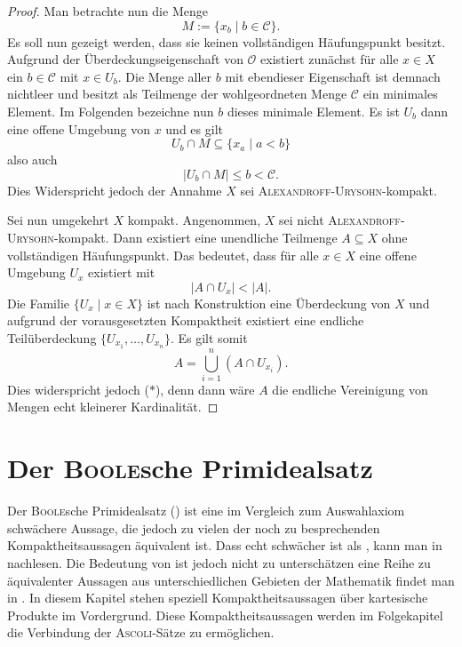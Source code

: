 \begin{proof}
  Man betrachte nun die Menge
  \begin{displaymath}
    M := \{ x_b \mid b \in \mathcal{C} \}.
  \end{displaymath}
  Es soll nun gezeigt werden, dass sie keinen vollständigen Häufungspunkt besitzt. 
  Aufgrund der Überdeckungseigenschaft von $\mathcal{O}$ existiert zunächst für alle $x \in X$ ein $b \in \mathcal{C}$ mit $x \in U_b$.
  Die Menge aller $b$ mit ebendieser Eigenschaft ist demnach nichtleer und besitzt als Teilmenge der wohlgeordneten Menge $\mathcal{C}$ ein minimales Element.
  Im Folgenden bezeichne nun $b$ dieses minimale Element.
  Es ist $U_b$ dann eine offene Umgebung von $x$ und es gilt 
  \begin{displaymath}
    U_b \cap M \subseteq \{x_a \mid a < b\}
  \end{displaymath}
  also auch
  \begin{displaymath}
    |U_b \cap M| \leq b < \mathcal{C}.
  \end{displaymath}
  Dies Widerspricht jedoch der Annahme $X$ sei \textsc{Alexandroff}-\textsc{Urysohn}-kompakt.

  Sei nun umgekehrt $X$ kompakt.
  Angenommen, $X$ sei nicht \textsc{Alexandroff}-\textsc{Urysohn}-kompakt.
  Dann existiert eine unendliche Teilmenge $A \subseteq X$ ohne vollständigen Häufungspunkt.
  Das bedeutet, dass für alle $x \in X$ eine offene Umgebung $U_x$ existiert mit
  \begin{displaymath}
    | A \cap U_x | < | A |. \tag{$\ast$}
  \end{displaymath}
  Die Familie $\{U_x \mid x \in X\}$ ist nach Konstruktion eine Überdeckung von $X$ und aufgrund der vorausgesetzten Kompaktheit existiert eine endliche Teilüberdeckung $\{U_{x_1},\dots,U_{x_n}\}$.
  Es gilt somit
  \begin{displaymath}
    A = \bigcup_{i = 1}^n (A \cap U_{x_i}).
  \end{displaymath}
  Dies widerspricht jedoch ($\ast$), denn dann wäre $A$ die endliche Vereinigung von Mengen echt kleinerer Kardinalität. 
\end{proof}

\section{Der \textsc{Boole}sche Primidealsatz}

Der \textsc{Boole}sche Primidealsatz (\PIT) ist eine im Vergleich zum Auswahlaxiom schwächere Aussage, die jedoch zu vielen der noch zu besprechenden Kompaktheitsaussagen äquivalent ist. 
Dass \PIT echt schwächer ist als \AC, kann man in \cite{halpern1971boolean} nachlesen.
Die Bedeutung von \PIT ist jedoch nicht zu unterschätzen eine Reihe zu \PIT äquivalenter Aussagen aus unterschiedlichen Gebieten der Mathematik findet man in \cite{dau1994diplom}.
In diesem Kapitel stehen speziell Kompaktheitsaussagen über kartesische Produkte im Vordergrund. Diese Kompaktheitsaussagen werden im Folgekapitel die Verbindung der \textsc{Ascoli}-Sätze zu \PIT ermöglichen.

